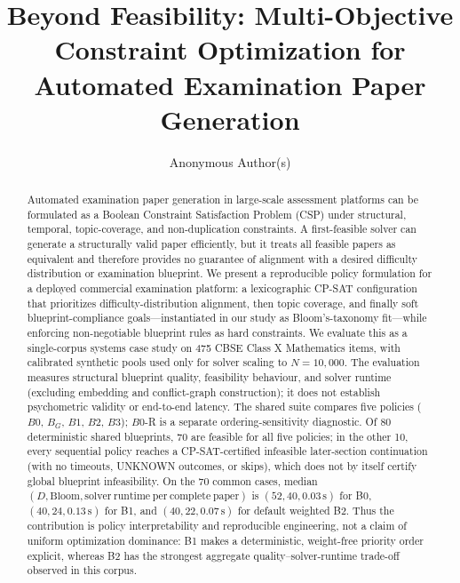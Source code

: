 \documentclass[runningheads]{llncs}
\begin{document}
\title{Beyond Feasibility: Multi-Objective Constraint Optimization for Automated Examination Paper Generation}


\author{Anonymous Author(s)}

\maketitle

\begin{abstract}
Automated examination paper generation in large-scale assessment platforms can be formulated as a Boolean Constraint Satisfaction Problem (CSP) under structural, temporal, topic-coverage, and non-duplication constraints.
A first-feasible solver can generate a structurally valid paper efficiently, but it treats all feasible papers as equivalent and therefore provides no guarantee of alignment with a desired difficulty distribution or examination blueprint.
We present a reproducible policy formulation for a deployed commercial examination platform: a lexicographic CP-SAT configuration that prioritizes difficulty-distribution alignment, then topic coverage, and finally soft blueprint-compliance goals---instantiated in our study as Bloom's-taxonomy fit---while enforcing non-negotiable blueprint rules as hard constraints.
We evaluate this as a single-corpus systems case study on 475 CBSE Class X Mathematics items, with calibrated synthetic pools used only for solver scaling to $N{=}10{,}000$.
The evaluation measures structural blueprint quality, feasibility behaviour, and solver runtime (excluding embedding and conflict-graph construction);
it does not establish psychometric validity or end-to-end latency. The shared suite compares five policies ($B0$, $B_G$, $B1$, $B2$, $B3$);
$B0$-R is a separate ordering-sensitivity diagnostic. Of 80 deterministic shared blueprints, 70 are feasible for all five policies;
in the other 10, every sequential policy reaches a CP-SAT-certified infeasible later-section continuation (with no timeouts, UNKNOWN outcomes, or skips), which does not by itself certify global blueprint infeasibility.
On the 70 common cases, median $(D,\mathrm{Bloom},\mathrm{solver\ runtime\ per\ complete\ paper})$ is $(52,40,0.03\,\mathrm{s})$ for B0, $(40,24,0.13\,\mathrm{s})$ for B1, and $(40,22,0.07\,\mathrm{s})$ for default weighted B2.
Thus the contribution is policy interpretability and reproducible engineering, not a claim of uniform optimization dominance: B1 makes a deterministic, weight-free priority order explicit, whereas B2 has the strongest aggregate quality--solver-runtime trade-off observed in this corpus.
\end{abstract}
\end{document}
